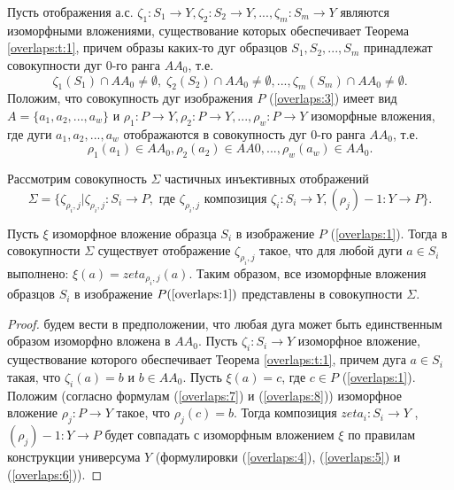 Пусть отображения а.с.  $\zeta_1 : S_1\to Y , \zeta_2: S_2 \to Y , ..., \zeta_m: S_m \to Y$  являются изоморфными вложениями, существование которых обеспечивает Теорема \ref{overlaps:t:1}, причем образы каких-то дуг образцов $S_1,  S_2 , ..., S_m$ принадлежат   совокупности дуг 0-го ранга $AA_0$, т.е. 
\begin{equation}
\zeta_1 (S_1) \cap  AA_0  \neq \emptyset,\;\zeta_2 (S_2) \cap  AA_0 \neq \emptyset, ..., \zeta_m(S_m) \cap  AA_0 \neq \emptyset.
\label{overlaps:7}
\end{equation}
Положим, что совокупность дуг изображения $P$ (\ref{overlaps:3}) имеет вид
$A = \{a_1, a_2, ..., a_w\}$ и $\rho_1 : P \to Y , \rho_2: P \to Y, ..., \rho_w: P \to Y$  изоморфные вложения, где дуги  $a_1, a_2, ..., a_w$ отображаются в совокупность дуг 0-го ранга $AA_0$, т.е. 
\begin{equation}
\rho_1(a_1) \in AA_0, \rho_2(a_2) \in AA0, ..., \rho_w (a_w) \in AA_0.
\label{overlaps:8}
\end{equation}

Рассмотрим совокупность $\Sigma$ частичных инъективных отображений  
\begin{equation}
\Sigma = \{ \zeta_{\rho_i,j} | \zeta_{\rho_i,j} : S_i \to P,\text{ где } \zeta_{\rho_i,j} \text{ композиция } \zeta_i : S_i \to Y , (\rho_j)-1 : Y \to P \}.
\label{overlaps:9}
\end{equation}

\begin{theorem}
Пусть  $\xi$  изоморфное вложение образца  $S_i$  в изображение  $P$  (\ref{overlaps:1}). Тогда в совокупности  $\Sigma$  существует отображение  $\zeta_{\rho_i,j}$  такое, что для любой дуги $a \in S_i$ выполнено: $\xi(a) = zeta_{\rho_i,j}(a)$. Таким образом, все изоморфные  вложения образцов  $S_i$  в изображение  $P (\ref{overlaps:1})$ представлены в совокупности $\Sigma$.
\label{overlaps:t:2}
\end{theorem}

\begin{proof}
будем вести в предположении, что любая дуга  может быть единственным образом изоморфно вложена в  $AA_0$. Пусть $\zeta_i : S_i  \to Y$ изоморфное вложение, существование которого  обеспечивает Теорема \ref{overlaps:t:1}, причем дуга $a \in S_i$ такая, что $\zeta_i (a) = b$  и   $b \in AA_0$.  Пусть $\xi(a) = c$,  где  $c \in P$  (\ref{overlaps:1}).  
Положим  (согласно формулам (\ref{overlaps:7})  и  (\ref{overlaps:8}))  изоморфное вложение $\rho_j : P \to Y$  такое, что  $\rho_j (c) = b$. Тогда   композиция  $zeta_i : S_i \to Y$ , $(\rho_j)-1 : Y \to P$  будет  совпадать с  изоморфным вложением $\xi$ по правилам конструкции универсума  $Y$  (формулировки   (\ref{overlaps:4}), (\ref{overlaps:5}) и  (\ref{overlaps:6})).
\end{proof}

